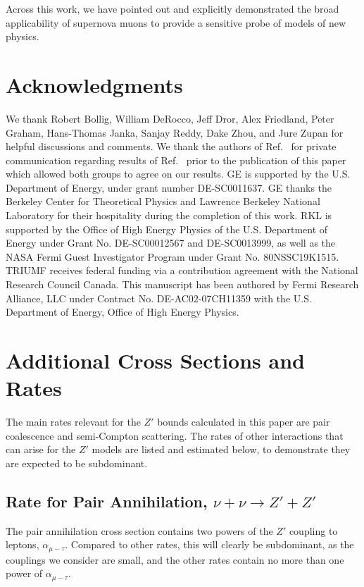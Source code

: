\documentclass[11pt]{article}
\begin{document}
Across this work, we have pointed out and explicitly demonstrated the broad applicability of supernova muons to provide a sensitive probe of models of new physics. 

\newpage
\section*{Acknowledgments}

We thank Robert Bollig, William DeRocco, Jeff Dror,  Alex Friedland, Peter Graham, Hans-Thomas Janka, Sanjay Reddy, Dake Zhou, and Jure Zupan for helpful discussions and comments. We thank the authors of Ref.~\cite{Bollig:2020xdr} for private communication regarding results of Ref.~\cite{Bollig:2020xdr} prior to the publication of this paper which allowed both groups to agree on our results. GE is supported by the U.S. Department of Energy, under grant number DE-SC0011637. GE thanks the Berkeley Center for Theoretical Physics and Lawrence Berkeley National Laboratory for their hospitality during the completion of this work. RKL is supported by the Office of High Energy Physics of the U.S. Department of Energy under Grant No. DE-SC00012567 and DE-SC0013999, as well as the NASA Fermi Guest Investigator Program under Grant No. 80NSSC19K1515. TRIUMF receives federal funding via a contribution agreement with the National Research Council Canada. This manuscript has been authored by Fermi Research Alliance, LLC under Contract No. DE-AC02-07CH11359 with the U.S. Department of Energy, Office of High Energy Physics.

\appendix



\section{Additional Cross Sections and Rates}
\label{app:rates}
The main rates relevant for the $Z'$ bounds calculated in this paper are pair coalescence and semi-Compton scattering. The rates of other interactions that can arise for the $Z'$ models are listed and estimated below, to demonstrate they are expected to be subdominant.


\subsection{Rate for Pair Annihilation, $\nu+\nu\rightarrow Z'+Z'$ }
 
The pair annihilation cross section contains two powers of the $Z'$ coupling to leptons, $\alpha_{\mu-\tau}$. Compared to other rates, this will clearly be subdominant, as the couplings we consider are small, and the other rates contain no more than one power of $\alpha_{\mu-\tau}$.
\end{document}
